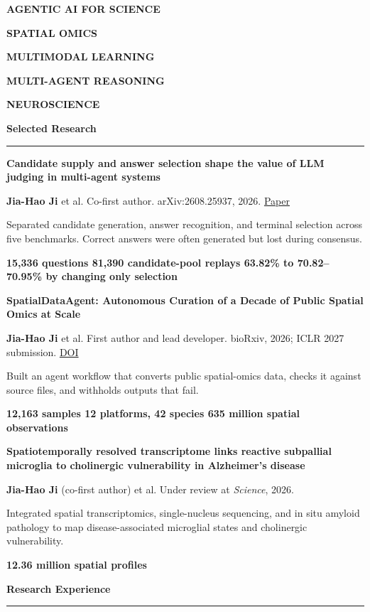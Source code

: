 \documentclass[10pt,a4paper]{article}
\newcommand{\sectiontitle}[1]{%
  \vspace{0.55em}%
  {\fontsize{10.7}{11.5}\selectfont\bfseries\color{Navy}#1}\par
  \vspace{-0.22em}\color{Rule}\rule{\linewidth}{0.45pt}\color{Ink}\vspace{0.27em}
}
\newcommand{\smallmeta}[1]{{\fontsize{7.8}{9.1}\selectfont\color{Muted}#1}}
\newcommand{\pubentry}[4]{%
  {\fontsize{8.75}{10.1}\selectfont\bfseries\color{Ink}\RaggedRight #1}\par
  \smallmeta{#2}\par
  \vspace{0.08em}
  {\fontsize{8.15}{9.55}\selectfont\RaggedRight #3}\par
  \vspace{0.06em}
  {\fontsize{7.8}{9.1}\selectfont\bfseries\color{Teal}#4}\par
  \vspace{0.38em}
}
\newcommand{\tag}[1]{\colorbox{SoftBlue}{\strut\hspace{0.28em}\fontsize{7.2}{8.2}\selectfont\bfseries\color{Navy}#1\hspace{0.28em}}}
\begin{document}
\tag{AGENTIC AI FOR SCIENCE}\hspace{0.32em}
\tag{SPATIAL OMICS}\hspace{0.32em}
\tag{MULTIMODAL LEARNING}\hspace{0.32em}
\tag{MULTI-AGENT REASONING}\hspace{0.32em}
\tag{NEUROSCIENCE}

\vspace{0.18em}

\begin{minipage}[t]{0.665\textwidth}
\vspace{0pt}\RaggedRight

\sectiontitle{Selected Research}

\pubentry
{Candidate supply and answer selection shape the value of LLM judging in multi-agent systems}
{\textbf{Jia-Hao Ji} et al. Co-first author. arXiv:2608.25937, 2026. \href{https://arxiv.org/abs/2608.25937}{Paper}}
{Separated candidate generation, answer recognition, and terminal selection across five benchmarks. Correct answers were often generated but lost during consensus.}
{15,336 questions \textbar{} 81,390 candidate-pool replays \textbar{} 63.82\% to 70.82--70.95\% by changing only selection}

\pubentry
{SpatialDataAgent: Autonomous Curation of a Decade of Public Spatial Omics at Scale}
{\textbf{Jia-Hao Ji} et al. First author and lead developer. bioRxiv, 2026; ICLR 2027 submission. \href{https://doi.org/10.64898/2026.05.27.727615}{DOI}}
{Built an agent workflow that converts public spatial-omics data, checks it against source files, and withholds outputs that fail.}
{12,163 samples \textbar{} 12 platforms, 42 species \textbar{} 635 million spatial observations}

\pubentry
{Spatiotemporally resolved transcriptome links reactive subpallial microglia to cholinergic vulnerability in Alzheimer's disease}
{\textbf{Jia-Hao Ji} (co-first author) et al. Under review at \textit{Science}, 2026.}
{Integrated spatial transcriptomics, single-nucleus sequencing, and in situ amyloid pathology to map disease-associated microglial states and cholinergic vulnerability.}
{12.36 million spatial profiles}

\sectiontitle{Research Experience}


\end{minipage}
\end{document}
